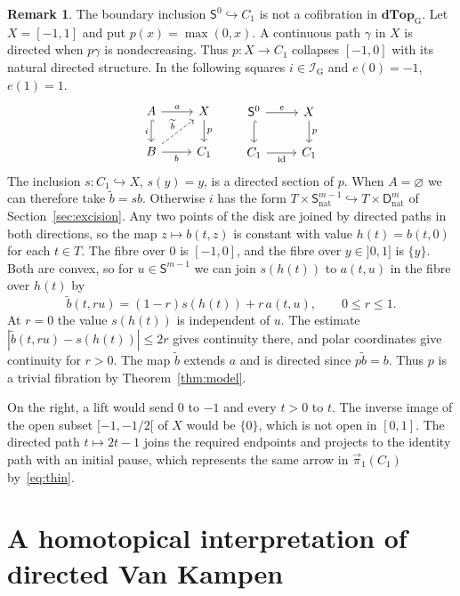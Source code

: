 \documentclass[12pt,a4paper]{amsart}
\theoremstyle{definition}
\newtheorem{remark}[theorem]{Remark}
\renewcommand{\leq}{\leqslant}
\renewcommand{\vec}{\overrightarrow}
\newcommand{\D}{\mathbf{dTop}}
\newcommand{\I}{\mathcal I_{\mathrm G}}
\newcommand{\MG}{\D_{\mathrm G}}
\newcommand{\rev}[1]{#1_{\mathrm{nat}}}
\newcommand{\cube}[1]{C_{#1}}
\newcommand{\PiC}{\vec{\pi}_1}
\begin{document}
\begin{remark}\label{rem:interval-boundary}
The boundary inclusion $\mathsf{S}^0\hookrightarrow\cube1$ is not a cofibration in $\MG$. Let $X=[-1,1]$ and put $p(x)=\max(0,x)$. A continuous path $\gamma$ in $X$ is directed when $p\gamma$ is nondecreasing. Thus $p\colon X\to\cube1$ collapses $[-1,0]$ with its natural directed structure. In the following squares $i\in\I$ and $e(0)=-1$, $e(1)=1$.
\[
\begin{tikzcd}
 A\ar[r,"a"]\ar[d,hook,"i"'] & X\ar[d,"p"]\\
 B\ar[r,"b"']\ar[ur,dashed,"\widetilde b"] & \cube1
\end{tikzcd}
\qquad
\begin{tikzcd}
 \mathsf{S}^0\ar[r,"e"]\ar[d,hook] & X\ar[d,"p"]\\
 \cube1\ar[r,"\mathrm{id}"'] & \cube1
\end{tikzcd}
\]
The inclusion $s\colon\cube1\hookrightarrow X$, $s(y)=y$, is a directed section of $p$. When $A=\varnothing$ we can therefore take $\widetilde b=sb$. Otherwise $i$ has the form $T\times\rev{\mathsf{S}^{m-1}}\hookrightarrow T\times\rev{\mathsf{D}^m}$ of Section~\ref{sec:excision}. Any two points of the disk are joined by directed paths in both directions, so the map $z\mapsto b(t,z)$ is constant with value $h(t)=b(t,0)$ for each $t\in T$. The fibre over $0$ is $[-1,0]$, and the fibre over $y\in{]}0,1]$ is $\{y\}$. Both are convex, so for $u\in\mathsf{S}^{m-1}$ we can join $s(h(t))$ to $a(t,u)$ in the fibre over $h(t)$ by
\[
 \widetilde b(t,ru)=(1-r)s(h(t))+r\,a(t,u),\qquad 0\leq r\leq1.
\]
At $r=0$ the value $s(h(t))$ is independent of $u$. The estimate $|\widetilde b(t,ru)-s(h(t))|\leq2r$ gives continuity there, and polar coordinates give continuity for $r>0$. The map $\widetilde b$ extends $a$ and is directed since $p\widetilde b=b$. Thus $p$ is a trivial fibration by Theorem~\ref{thm:model}.

On the right, a lift would send $0$ to $-1$ and every $t>0$ to $t$. The inverse image of the open subset $[-1,-1/2[$ of $X$ would be $\{0\}$, which is not open in $[0,1]$. The directed path $t\mapsto 2t-1$ joins the required endpoints and projects to the identity path with an initial pause, which represents the same arrow in $\PiC(\cube1)$ by~\eqref{eq:thin}.
\end{remark}

\section{A homotopical interpretation of directed Van Kampen}\label{sec:van-kampen}
\end{document}
